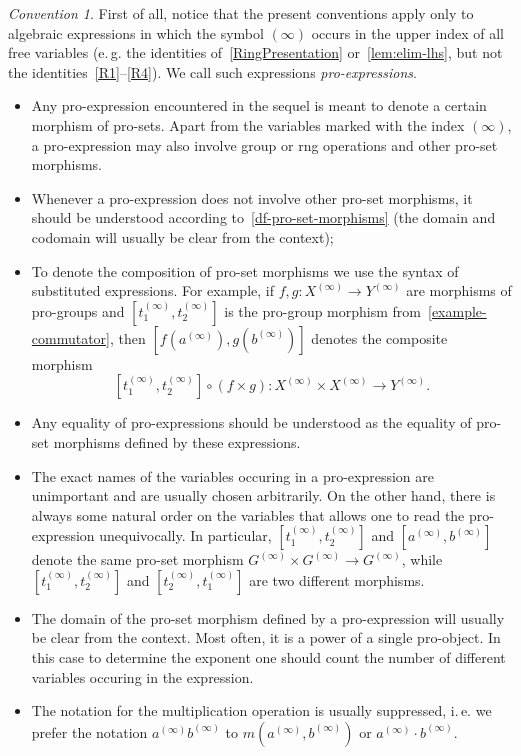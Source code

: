 \documentclass[oneside, 11pt]{amsart}
\numberwithin{equation}{section}
\theoremstyle{definition}
\theoremstyle{remark}
\newtheorem{conv}[lemma]{Convention} \Crefname{conv}{Convention}{Conventions}
\begin{document}
\begin{conv} \label{conv:notation}
First of all, notice that the present conventions apply only to algebraic expressions in which the symbol $(\infty)$ occurs in the upper index of all free variables (e.\,g. the identities of~\cref{RingPresentation} or~\cref{lem:elim-lhs}, but not the identities~\eqref{R1}--\eqref{R4}). We call such expressions {\it pro-expressions}.
 \begin{itemize}
  \item Any pro-expression encountered in the sequel is meant to denote a certain morphism of pro-sets. Apart from the variables marked with the index $(\infty)$, a pro-expression may also involve group or rng operations and other pro-set morphisms.
  \item Whenever a pro-expression does not involve other pro-set morphisms, it should be understood according to~\cref{df-pro-set-morphisms} (the domain and codomain will usually be clear from the context);
  \item To denote the composition of pro-set morphisms we use the syntax of substituted expressions. For example, if $f, g \colon X^{(\infty)} \to Y^{(\infty)}$ are morphisms of pro-groups and $[t_1^{(\infty)}, t_2^{(\infty)}]$ is the pro-group morphism from~\cref{example-commutator}, then $[f(a^{(\infty)}), g(b^{(\infty)})]$ denotes the composite morphism \[[t_1^{(\infty)}, t_2^{(\infty)}] \circ (f\times g) \colon X^{(\infty)} \times X^{(\infty)} \to Y^{(\infty)}.\]  
  \item Any equality of pro-expressions should be understood as the equality of pro-set morphisms defined by these expressions.
  \item The exact names of the variables occuring in a pro-expression are unimportant and are usually chosen arbitrarily. On the other hand, there is always some natural order on the variables that allows one to read the pro-expression unequivocally. In particular, $[t_1^{(\infty)}, t_2^{(\infty)}]$ and $[a^{(\infty)}, b^{(\infty)}]$ denote the same pro-set morphism $G^{(\infty)} \times G^{(\infty)} \to G^{(\infty)}$, while $[t_1^{(\infty)}, t_2^{(\infty)}]$ and $[t_2^{(\infty)}, t_1^{(\infty)}]$ are two different morphisms.
  \item The domain of the pro-set morphism defined by a pro-expression will usually be clear from the context. 
  Most often, it is a power of a single pro-object. In this case to determine the exponent one should count the number of different variables occuring in the expression.
  \item The notation for the multiplication operation is usually suppressed, i.\,e. we prefer the notation $a^{(\infty)} b^{(\infty)}$ to $m(a^{(\infty)}, b^{(\infty)})$ or $a^{(\infty)} \cdot b^{(\infty)}$.

\end{itemize}
\end{conv}
\end{document}
